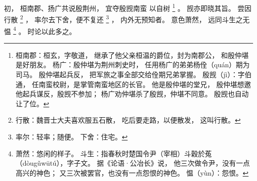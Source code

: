
\switchcolumn*[\section{}]

初，
桓南郡、扬广共说殷荆州，
宜夺殷觊南蛮
以自树%
\footnote{%
    桓南郡：桓玄，字敬道，
            继承了他父亲桓温的爵位，封为南郡公，
            和殷仲堪是好朋友。
    杨广：殷仲堪为荆州刺史时，
          任用杨广的弟弟杨佺（quán）期为司马。
          殷仲堪起兵反，
          把军旅之事全部交给佺期兄弟掌握。
    殷觊（jì）：字伯通，
                任南蛮校尉，是掌管南蛮地区的长官。
                他是殷仲堪的堂兄，
                殷仲堪想邀他起兵谋反，殷觊不参加；
                杨广劝仲堪杀了殷觊，仲堪不同意。
                殷觊也自动让了位。
}%
。
觊亦即晓其旨。
尝因行散%
\footnote{%
    行散：魏晋士大夫喜欢服五石散，
          吃后要走路，以便散发，
          这叫行散。
}%
，
率尔去下舍，便不复还%
\footnote{%
    率尔：轻率；随便。
    下舍：住宅。
}%
，
内外无预知者。
意色萧然，
远同斗生之无愠%
\footnote{%
    萧然：悠闲的样子。
    斗生：指春秋时楚国令尹（宰相）斗穀於菟（dòugǔwūtú），字子文。
          据《论语·公冶长》说，
          他三次做令尹，没有一点高兴的神色；
          又三次被罢官，也没有一点怨恨的神色。
    愠（yùn）：怨恨。
}%
。
时论以此多之。

\switchcolumn




